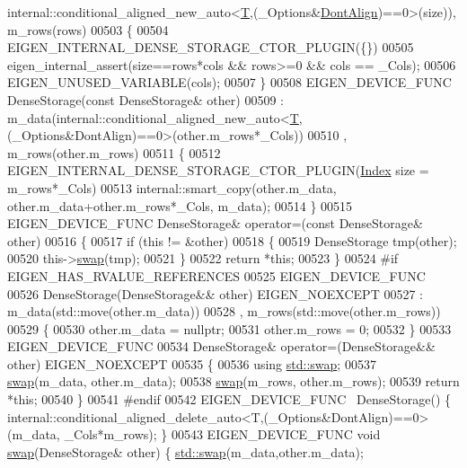 \begin{DoxyCode}
      internal::conditional\_aligned\_new\_auto<\hyperlink{group___sparse_core___module}{T},(\_Options&\hyperlink{group__enums_ggaacded1a18ae58b0f554751f6cdf9eb13a40a452614141522dd313363dbbd65726}{DontAlign})==0>(size)), m\_rows(rows)
00503     \{
00504       EIGEN\_INTERNAL\_DENSE\_STORAGE\_CTOR\_PLUGIN(\{\})
00505       eigen\_internal\_assert(size==rows*cols && rows>=0 && cols == \_Cols);
00506       EIGEN\_UNUSED\_VARIABLE(cols);
00507     \}
00508     EIGEN\_DEVICE\_FUNC DenseStorage(\textcolor{keyword}{const} DenseStorage& other)
00509       : m\_data(internal::conditional\_aligned\_new\_auto<\hyperlink{group___sparse_core___module}{T},(\_Options&DontAlign)==0>(other.m\_rows*\_Cols))
00510       , m\_rows(other.m\_rows)
00511     \{
00512       EIGEN\_INTERNAL\_DENSE\_STORAGE\_CTOR\_PLUGIN(\hyperlink{namespace_eigen_a62e77e0933482dafde8fe197d9a2cfde}{Index} size = m\_rows*\_Cols)
00513       internal::smart\_copy(other.m\_data, other.m\_data+other.m\_rows*\_Cols, m\_data);
00514     \}
00515     EIGEN\_DEVICE\_FUNC DenseStorage& operator=(\textcolor{keyword}{const} DenseStorage& other)
00516     \{
00517       \textcolor{keywordflow}{if} (\textcolor{keyword}{this} != &other)
00518       \{
00519         DenseStorage tmp(other);
00520         this->\hyperlink{endian_8c_a3ca5ecd34b04d6a243c054ac3a57f68d}{swap}(tmp);
00521       \}
00522       \textcolor{keywordflow}{return} *\textcolor{keyword}{this};
00523     \}    
00524 \textcolor{preprocessor}{#if EIGEN\_HAS\_RVALUE\_REFERENCES}
00525     EIGEN\_DEVICE\_FUNC
00526     DenseStorage(DenseStorage&& other) EIGEN\_NOEXCEPT
00527       : m\_data(std::move(other.m\_data))
00528       , m\_rows(std::move(other.m\_rows))
00529     \{
00530       other.m\_data = \textcolor{keyword}{nullptr};
00531       other.m\_rows = 0;
00532     \}
00533     EIGEN\_DEVICE\_FUNC
00534     DenseStorage& operator=(DenseStorage&& other) EIGEN\_NOEXCEPT
00535     \{
00536       \textcolor{keyword}{using} \hyperlink{endian_8c_a3ca5ecd34b04d6a243c054ac3a57f68d}{std::swap};
00537       \hyperlink{endian_8c_a3ca5ecd34b04d6a243c054ac3a57f68d}{swap}(m\_data, other.m\_data);
00538       \hyperlink{endian_8c_a3ca5ecd34b04d6a243c054ac3a57f68d}{swap}(m\_rows, other.m\_rows);
00539       \textcolor{keywordflow}{return} *\textcolor{keyword}{this};
00540     \}
00541 \textcolor{preprocessor}{#endif}
00542     EIGEN\_DEVICE\_FUNC ~DenseStorage() \{ 
      internal::conditional\_aligned\_delete\_auto<T,(\_Options&DontAlign)==0>(m\_data, \_Cols*m\_rows); \}
00543     EIGEN\_DEVICE\_FUNC \textcolor{keywordtype}{void} \hyperlink{endian_8c_a3ca5ecd34b04d6a243c054ac3a57f68d}{swap}(DenseStorage& other) \{ \hyperlink{endian_8c_a3ca5ecd34b04d6a243c054ac3a57f68d}{std::swap}(m\_data,other.m\_data); 

\end{DoxyCode}
